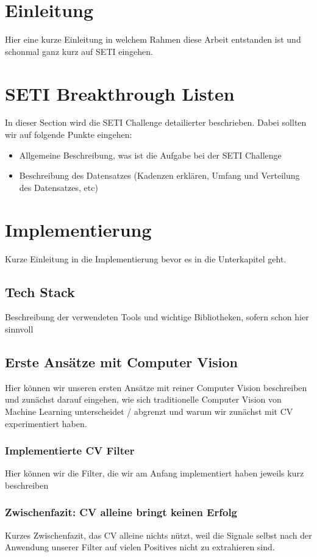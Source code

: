 \documentclass[12pt, a4paper]{article}
\begin{document}
\tableofcontents

\section{Einleitung}
Hier eine kurze Einleitung in welchem Rahmen diese Arbeit entstanden ist und schonmal ganz kurz auf SETI eingehen.

\section{SETI Breakthrough Listen}
In dieser Section wird die SETI Challenge detailierter beschrieben. Dabei sollten wir auf folgende Punkte eingehen:
\begin{itemize}
	\item Allgemeine Beschreibung, was ist die Aufgabe bei der SETI Challenge
	\item Beschreibung des Datensatzes (Kadenzen erklären, Umfang und Verteilung des Datensatzes, etc)
\end{itemize}

\section{Implementierung}
Kurze Einleitung in die Implementierung bevor es in die Unterkapitel geht.

\subsection{Tech Stack}
Beschreibung der verwendeten Tools und wichtige Bibliotheken, sofern schon hier sinnvoll

\subsection{Erste Ansätze mit Computer Vision}
Hier können wir unseren ersten Ansätze mit reiner Computer Vision beschreiben und zunächst darauf eingehen, wie sich traditionelle Computer Vision von Machine Learning unterscheidet / abgrenzt und warum wir zunächst mit CV experimentiert haben.

\subsubsection{Implementierte CV Filter}
Hier können wir die Filter, die wir am Anfang implementiert haben jeweils kurz beschreiben

\subsubsection{Zwischenfazit: CV alleine bringt keinen Erfolg}
Kurzes Zwischenfazit, das CV alleine nichts nützt, weil die Signale selbst nach der Anwendung unserer Filter auf vielen Positives nicht zu extrahieren sind.
\end{document}
